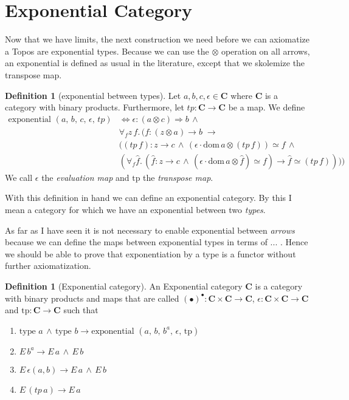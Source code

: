 \documentclass[a4paper, 11pt]{article}
\theoremstyle{definition}
\newtheorem{definition}[theorem]{Definition}
\newcommand{\cat}{%
	\mathbf %
}
\newcommand{\domain}[ 1 ]{%
	\mathrm{dom} \, #1 %
}
\newcommand{\notion}[1]{\text{#1 }}
\newcommand{\expon}[5]{\notion{exponential} (#1, \, #2, \, #3, \, #4, \, #5)}
\begin{document}
\section{Exponential Category}

Now that we have limits, the next construction we need before we can axiomatize a Topos are exponential types. Because we can use the $\otimes$ operation on all arrows, an exponential is defined as usual in the literature, except that we skolemize the transpose map.

\begin{definition}[exponential between types]
	Let $a, b, c, \epsilon \in \cat C$ where $\cat C$ is a category with binary products. Furthermore, let $tp: \cat C \to \cat C$ be a map. We define
	\begin{align*}
		\expon{a}{b}{c}{\epsilon}{tp} & \Longleftrightarrow \epsilon:(a \otimes c) \Rightarrow b \, \wedge \\
		& \forall_f z \, f. \, (f:(z \otimes a) \rightarrow b \; \longrightarrow \\ 
		&((tp \, f):z \rightarrow c \, \wedge \, (\epsilon \cdot \domain{a} \otimes (tp \, f)) \simeq f \, \wedge \\
		& (\forall_f \hat{f}. \, (\hat{f}:z \rightarrow c \, \wedge \, (\epsilon \cdot \domain{a} \otimes \hat{f}) \simeq f) \longrightarrow \hat{f} \simeq (tp \, f))))
	\end{align*}
	We call $\epsilon$ the \emph{evaluation map} and $\text{tp}$ the \emph{transpose map}.
\end{definition}

With this definition in hand we can define an exponential category. By this I mean a category for which we have an exponential between two \emph{types}.

As far as I have seen it is not necessary to enable exponential between \emph{arrows} because we can define the maps between exponential types in terms of ... . Hence we should be able to prove that exponentiation by a type is a functor without further axiomatization.

\begin{definition}[Exponential category]
	An Exponential category $\cat C$ is a category with binary products and maps that are called $(\bullet)^{\bullet}: \cat C \times \cat C \to \cat C$, $\epsilon: \cat C \times \cat C \to \cat C$ and $\text{tp}: \cat C \to \cat C$ such that
	\begin{enumerate}
		\item $\notion{type} a \, \wedge \, \notion{type} b \longrightarrow \expon{a}{b}{b^{a}}{\epsilon}{\text{tp}}$
		\item $E \, b^{a} \longrightarrow E \, a \, \wedge \, E\, b $
		\item $E \, \epsilon(a, b) \longrightarrow E \, a \, \wedge \, E \, b$
		\item $E \, (tp\, a) \longrightarrow E \, a$
	\end{enumerate}
\end{definition}
\end{document}
